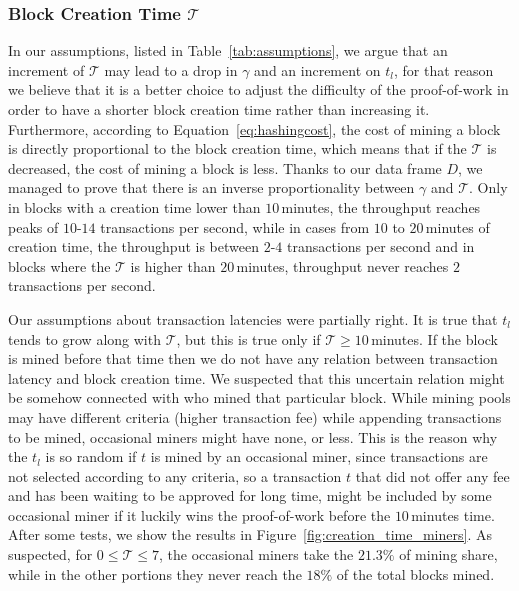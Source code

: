 \documentclass[USenglish]{uit-thesis}
\begin{document}
\subsubsection{Block Creation Time $\mathcal{T}$}
In our assumptions, listed in Table~\ref{tab:assumptions}, we argue
that an increment of $\mathcal{T}$ may lead to a
drop in $\gamma$ and an increment on $t_l$, for that reason we believe
that it is a better choice to adjust the difficulty of the proof-of-work in order to
have a shorter block creation time rather than increasing it. Furthermore,
according to Equation~\ref{eq:hashingcost},
the cost of mining a block is directly proportional to the block creation
time, which means that if the $\mathcal{T}$ is decreased, the cost of
mining a block is less. Thanks to our data frame $D$, we managed to
prove that there is an inverse proportionality between $\gamma$ and
$\mathcal{T}$. Only in blocks with a creation time lower than $10$\,minutes,
the throughput reaches peaks of $10$-$14$ transactions per second, while in
cases from $10$ to $20$\,minutes of creation
time, the throughput is between
$2$-$4$ transactions per second and in blocks where the $\mathcal{T}$ is
higher than $20$\,minutes, throughput never reaches
$2$ transactions per second.

Our assumptions about transaction latencies were partially right.
It is true that $t_l$ tends to grow along with
$\mathcal{T}$, but this is true
only if $\mathcal{T} \geq 10$\,minutes. If the block is mined
before that time then we do not have any relation between
transaction latency and block creation time.
We suspected that this uncertain relation might be
somehow connected with who mined that particular block.
While mining pools may have different criteria (higher transaction
fee) while appending transactions to be mined,
occasional miners might have none, or less. This is the reason why
the $t_l$ is so random if $t$ is mined by an occasional miner,
since transactions are not selected
according to any criteria, so a transaction $t$ that did not offer any fee
and has been waiting to be approved for long time, might be included
by some occasional miner if it luckily wins the proof-of-work before
the $10$\,minutes time. After some tests, we show the results in
Figure~\ref{fig:creation_time_miners}. As suspected, for $0 \leq \mathcal{T} \leq 7$,
the occasional miners take the $21.3\%$ of mining share, while in the
other portions they never reach the $18\%$ of the total blocks mined.
\end{document}
